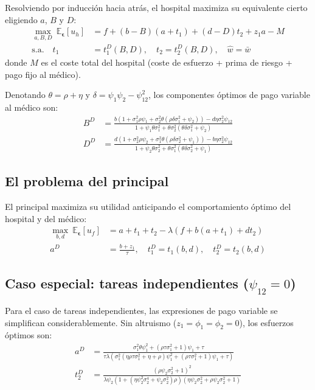 \documentclass[12pt, a4paper, twoside, openright]{book}
\newcommand{\E}{\mathbb{E}}
\theoremstyle{plain}
\theoremstyle{definition}
\theoremstyle{remark}
\begin{document}
Resolviendo por inducción hacia atrás, el hospital maximiza su equivalente cierto eligiendo $a$, $B$ y $D$:
\begin{align*}
  \max_{a,B,D}\ \E_{\bm{\epsilon}}[u_h] &= f+(b-B)(a+t_1)+(d-D)t_2+z_1a-M\\
  \text{s.a.}\quad t_1 &= t_1^{D}(B,D), \quad t_2 = t_2^{D}(B,D), \quad \widehat{w}=\bar{w}
\end{align*}
donde $M$ es el coste total del hospital (coste de esfuerzo + prima de riesgo + pago fijo al médico).

Denotando $\theta=\rho+\eta$ y $\delta=\psi_1\psi_2-\psi_{12}^2$, los componentes óptimos de pago variable al médico son:
\begin{align}
  B^D &= \frac{b(1+\sigma_1^2\rho\psi_1+\sigma_2^2\theta(\rho\delta\sigma_1^2+\psi_2))-d\eta\sigma_2^2\psi_{12}}{1+\psi_1\theta\sigma_1^2+\theta\sigma_2^2(\theta\delta\sigma_1^2+\psi_2)} \label{eq:BD}\\
  D^D &= \frac{d(1+\sigma_2^2\rho\psi_2+\sigma_1^2\theta(\rho\delta\sigma_2^2+\psi_1))-b\eta\sigma_2^2\psi_{12}}{1+\psi_2\theta\sigma_2^2+\theta\sigma_1^2(\theta\delta\sigma_2^2+\psi_1)} \label{eq:DD}
\end{align}

\subsection{El problema del principal}

El principal maximiza su utilidad anticipando el comportamiento óptimo del hospital y del médico:
\begin{align*}
  \max_{b,d}\ \E_{\bm{\epsilon}}[u_f] &= a+t_1+t_2-\lambda(f+b(a+t_1)+dt_2)\\
  a^D &= \frac{b+z_1}{\tau}, \quad t_1^D = t_1(b,d), \quad t_2^D = t_2(b,d)
\end{align*}

\subsection{Caso especial: tareas independientes (\texorpdfstring{$\psi_{12}=0$}{psi\_12=0})}

Para el caso de tareas independientes, las expresiones de pago variable se simplifican considerablemente. Sin altruismo ($z_1=\phi_1=\phi_2=0$), los esfuerzos óptimos son:
\begin{align}
  a^D &= \frac{\sigma_1^2\theta\psi_1^2+(\rho\tau\sigma_1^2+1)\psi_1+\tau}{\tau\lambda(\sigma_1^2(\eta\rho\tau\sigma_1^2+\eta+\rho)\psi_1^2+(\rho\tau\sigma_1^2+1)\psi_1+\tau)} \label{eq:aD_indep}\\
  t_2^D &= \frac{(\rho\psi_2\sigma_2^2+1)^2}{\lambda\psi_2(1+(\eta\psi_2^2\sigma_2^4+\psi_2\sigma_2^2)\rho)(\eta\psi_2\sigma_2^2+\rho\psi_2\sigma_2^2+1)} \label{eq:t2D_indep}
\end{align}
\end{document}
